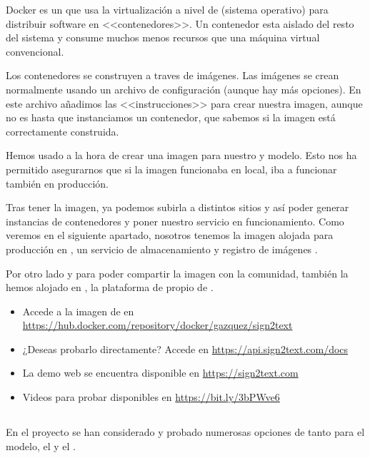 Docker es un  que usa la virtualización a nivel de  (sistema operativo) para distribuir software en <<contenedores>>. Un contenedor esta aislado del resto del sistema y consume muchos menos recursos que una máquina virtual convencional.

Los contenedores se construyen a traves de imágenes. Las imágenes se crean normalmente usando un archivo de configuración  (aunque hay más opciones). En este archivo añadimos las <<instrucciones>> para crear nuestra imagen, aunque no es hasta que instanciamos un contenedor, que sabemos si la imagen está correctamente construida.

Hemos usado  a la hora de crear una imagen para nuestro  y modelo. Esto nos ha permitido asegurarnos que si la imagen funcionaba en local, iba a funcionar también en producción.

Tras tener la imagen, ya podemos subirla a distintos sitios y así poder generar instancias de contenedores y poner nuestro servicio en funcionamiento. Como veremos en el siguiente apartado, nosotros tenemos la imagen alojada para producción en , un servicio de almacenamiento y registro de imágenes .

Por otro lado y para poder compartir la imagen con la comunidad, también la hemos alojado en , la plataforma de  propio de .

\begin{itemize}
  \item Accede a la imagen de  en \url{https://hub.docker.com/repository/docker/gazquez/sign2text}
  \item ¿Deseas probarlo directamente? Accede en \url{https://api.sign2text.com/docs}
  \item La demo web se encuentra disponible en \url{https://sign2text.com}
  \item Videos para probar disponibles en \url{https://bit.ly/3bPWve6}
\end{itemize}

\subsection{}

En el proyecto se han considerado y probado numerosas opciones de  tanto para el modelo, el  y el .

